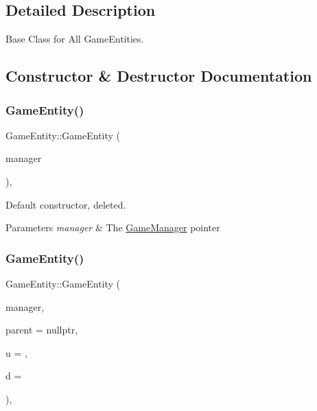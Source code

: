 \subsection{Detailed Description}
Base Class for All Game\+Entities. 

\subsection{Constructor \& Destructor Documentation}
\mbox{\label{class_game_entity_ae74835425142887619b13b9c11ea35f1}} 
\subsubsection{\texorpdfstring{GameEntity()}{GameEntity()}\hspace{0.1cm}{\footnotesize\ttfamily [1/2]}}
{\footnotesize\ttfamily Game\+Entity\+::\+Game\+Entity (\begin{DoxyParamCaption}\item[{\mbox{\hyperlink{class_game_manager}{Game\+Manager}} $\ast$}]{manager }\end{DoxyParamCaption})\hspace{0.3cm}{\ttfamily [protected]}, {\ttfamily [delete]}}



Default constructor, deleted. 


\begin{DoxyParams}{Parameters}
{\em manager} & The \mbox{\hyperlink{class_game_manager}{Game\+Manager}} pointer \\
\hline
\end{DoxyParams}
\mbox{\label{class_game_entity_a49861d170270b2c4caeec0a058f52c7e}} 
\subsubsection{\texorpdfstring{GameEntity()}{GameEntity()}\hspace{0.1cm}{\footnotesize\ttfamily [2/2]}}
{\footnotesize\ttfamily Game\+Entity\+::\+Game\+Entity (\begin{DoxyParamCaption}\item[{\mbox{\hyperlink{class_game_manager}{Game\+Manager}} $\ast$}]{manager,  }\item[{\mbox{\hyperlink{class_game_entity}{Game\+Entity}} $\ast$}]{parent = {\ttfamily nullptr},  }\item[{int}]{u = {},  }\item[{int}]{d = {} }\end{DoxyParamCaption})\hspace{0.3cm}{\ttfamily [inline]}, {\ttfamily [protected]}}



